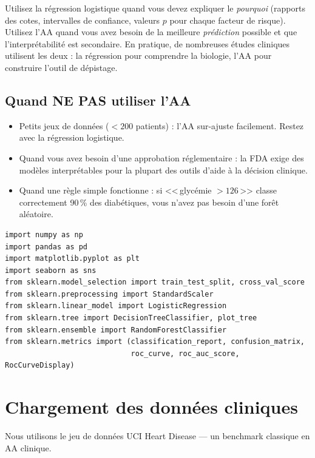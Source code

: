 \begin{clinicalnote}
Utilisez la r\'egression logistique quand vous devez expliquer le \emph{pourquoi} (rapports des cotes, intervalles de confiance, valeurs $p$ pour chaque facteur de risque). Utilisez l'AA quand vous avez besoin de la meilleure \emph{pr\'ediction} possible et que l'interpr\'etabilit\'e est secondaire. En pratique, de nombreuses \'etudes cliniques utilisent les deux : la r\'egression pour comprendre la biologie, l'AA pour construire l'outil de d\'epistage.
\end{clinicalnote}

\subsection{Quand NE PAS utiliser l'AA}

\begin{itemize}
  \item Petits jeux de donn\'ees ($< 200$ patients) : l'AA sur-ajuste facilement. Restez avec la r\'egression logistique.
  \item Quand vous avez besoin d'une approbation r\'eglementaire : la FDA exige des mod\`eles interpr\'etables pour la plupart des outils d'aide \`a la d\'ecision clinique.
  \item Quand une r\`egle simple fonctionne : si <<\,glyc\'emie $> 126$\,>> classe correctement 90\,\% des diab\'etiques, vous n'avez pas besoin d'une for\^et al\'eatoire.
\end{itemize}

\begin{verbatim}
import numpy as np
import pandas as pd
import matplotlib.pyplot as plt
import seaborn as sns
from sklearn.model_selection import train_test_split, cross_val_score
from sklearn.preprocessing import StandardScaler
from sklearn.linear_model import LogisticRegression
from sklearn.tree import DecisionTreeClassifier, plot_tree
from sklearn.ensemble import RandomForestClassifier
from sklearn.metrics import (classification_report, confusion_matrix,
                             roc_curve, roc_auc_score, RocCurveDisplay)
\end{verbatim}

\section{Chargement des donn\'ees cliniques}

Nous utilisons le jeu de donn\'ees UCI Heart Disease --- un benchmark classique en AA clinique.

